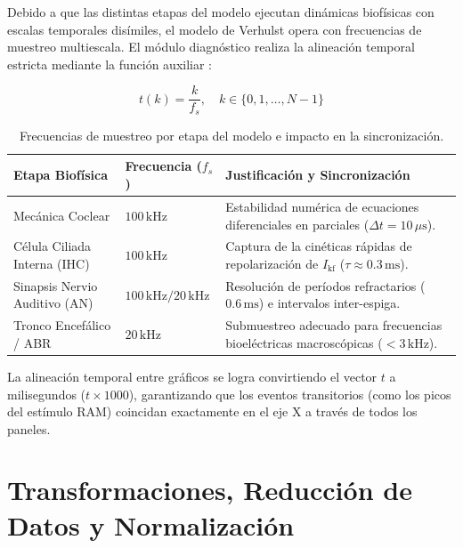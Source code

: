 \documentclass[12pt,a4paper]{article}
\begin{document}
Debido a que las distintas etapas del modelo ejecutan dinámicas biofísicas con escalas temporales disímiles, el modelo de Verhulst opera con frecuencias de muestreo multiescala. El módulo diagnóstico realiza la alineación temporal estricta mediante la función auxiliar :

\begin{equation}
t(k) = \frac{k}{f_s}, \quad k \in \{0, 1, \dots, N-1\}
\end{equation}

\begin{table}[H]
\centering
\caption{Frecuencias de muestreo por etapa del modelo e impacto en la sincronización.}
\label{tab:frecuencias}
\begin{tabularx}{\textwidth}{>{\raggedright\arraybackslash}p{3.2cm} >{\centering\arraybackslash}p{3.0cm} X}
\toprule
\textbf{Etapa Biofísica} & \textbf{Frecuencia ($f_s$)} & \textbf{Justificación y Sincronización} \\
\midrule
Mecánica Coclear & $100\,\text{kHz}$ & Estabilidad numérica de ecuaciones diferenciales en parciales ($\Delta t = 10\,\mu\text{s}$). \\
Célula Ciliada Interna (IHC) & $100\,\text{kHz}$ & Captura de la cinéticas rápidas de repolarización de $I_{\text{kf}}$ ($\tau \approx 0.3\,\text{ms}$). \\
Sinapsis Nervio Auditivo (AN) & $100\,\text{kHz} / 20\,\text{kHz}$ & Resolución de períodos refractarios ($0.6\,\text{ms}$) e intervalos inter-espiga. \\
Tronco Encefálico / ABR & $20\,\text{kHz}$ & Submuestreo adecuado para frecuencias bioeléctricas macroscópicas ($< 3\,\text{kHz}$). \\
\bottomrule
\end{tabularx}
\end{table}

La alineación temporal entre gráficos se logra convirtiendo el vector $t$ a milisegundos ($t \times 1000$), garantizando que los eventos transitorios (como los picos del estímulo RAM) coincidan exactamente en el eje X a través de todos los paneles.

\section{Transformaciones, Reducción de Datos y Normalización}
\end{document}
